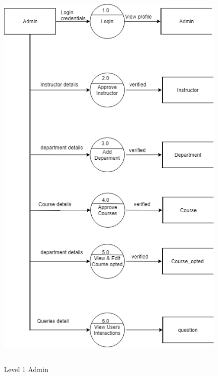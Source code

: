 \begin{figure}
  \includegraphics[height=20cm]{level1dfdAdmin.png}
  \caption{Level 1 Admin}
  \label{fig1:Data Flow Diagram Level 1 : Admin}
\end{figure}


